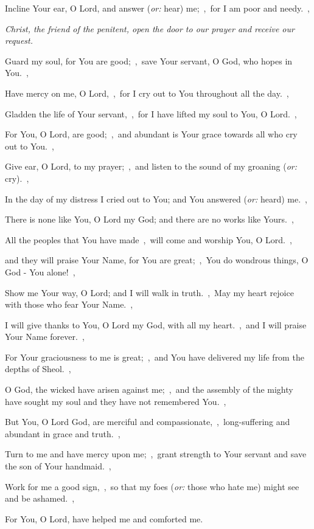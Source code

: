 \documentclass[12pt,twoside,a5paper]{article}
\newcommand{\qanona}[1]{{\liturgicalhint{Qanona.} \emph{#1}}}
\newcommand{\translationoption}[1]{\emph{or:} #1}
\begin{document}
\begin{normalparskip}
  Incline Your ear, O Lord, and answer (\translationoption{hear}) me;~\sep\ for I am poor and needy.~\sep

  \qanona{Christ, the friend of the penitent, open the door to our prayer and receive our request.}

  Guard my soul, for You are good;~\sep\ save Your servant, O God, who hopes in You.~\sep

  Have mercy on me, O Lord,~\sep\ for I cry out to You throughout all the day.~\sep

  Gladden the life of Your servant,~\sep\ for I have lifted my soul to You, O Lord.~\sep

  For You, O Lord, are good;~\sep\ and abundant is Your grace towards all who cry out to You.~\sep

  Give ear, O Lord, to my prayer;~\sep\ and listen to the sound of my groaning (\translationoption{cry}).~\sep

  In the day of my distress I cried out to You; and You answered (\translationoption{heard}) me.~\sep

  There is none like You, O Lord my God; and there are no works like Yours.~\sep

  All the peoples that You have made~\sep\ will come and worship You, O Lord.~\sep

  and they will praise Your Name, for You are great;~\sep\ You do wondrous things, O God - You alone!~\sep

  Show me Your way, O Lord; and I will walk in truth.~\sep\ May my heart rejoice with those who fear Your Name.~\sep

  I will give thanks to You, O Lord my God, with all my heart.~\sep\ and I will praise Your Name forever.~\sep

  For Your graciousness to me is great;~\sep\ and You have delivered my life from the depths of Sheol.~\sep

  O God, the wicked have arisen against me;~\sep\ and the assembly of the mighty have sought my soul and they have not remembered You.~\sep

  But You, O Lord God, are merciful and compassionate,~\sep\ long-suffering and abundant in grace and truth.~\sep

  Turn to me and have mercy upon me;~\sep\ grant strength to Your servant and save the son of Your handmaid.~\sep

  Work for me a good sign,~\sep\ so that my foes (\translationoption{those who hate me}) might see and be ashamed.~\sep

  For You, O Lord, have helped me and comforted me.
\end{normalparskip}
\end{document}
